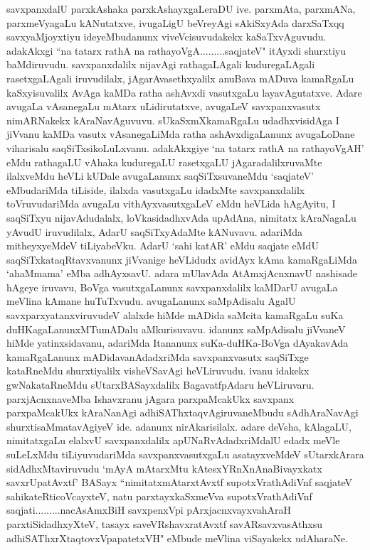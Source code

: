 \begin{artha}
savxpanxdalU parxkAshaka parxkAshayxgaLeraDU ive. parxmAta, parxmANa, parxmeVyagaLu kANutatxve, ivugaLigU beVreyAgi sAkiSxyAda darxSaTxqq savxyaMjoyxtiyu ideyeMbudanunx viveVcisuvudakekx kaSaTxvAguvudu. adakAkxgi ``na tatarx rathA na rathayoVgA.........saqjateV" itAyxdi shurxtiyu baMdiruvudu. savxpanxdalilx nijavAgi rathagaLAgali kuduregaLAgali rasetxgaLAgali iruvudilalx, jAgarAvasethxyalilx anuBava mADuva kamaRgaLu kaSxyisuvalilx AvAga kaMDa ratha ashAvxdi vasutxgaLu layavAgutatxve. Adare avugaLa vAsanegaLu mAtarx uLidirutatxve, avugaLeV savxpanxvasutx nimARNakekx kAraNavAguvuvu. sUkaSxmXkamaRgaLu udadhxvisidAga I jiVvanu kaMDa vasutx vAsanegaLiMda ratha ashAvxdigaLanunx avugaLoDane viharisalu saqSiTxsikoLuLxvanu. adakAkxgiye `na tatarx rathA na rathayoVgAH' eMdu rathagaLU vAhaka kuduregaLU rasetxgaLU jAgaradalilxruvaMte ilalxveMdu heVLi kUDale avugaLanunx saqSiTxsuvaneMdu `saqjateV' eMbudariMda tiLiside, ilalxda vasutxgaLu idadxMte savxpanxdalilx toVruvudariMda avugaLu vithAyxvasutxgaLeV eMdu heVLida hAgAyitu, I saqSiTxyu nijavAdudalalx, loVkasidadhxvAda upAdAna, nimitatx kAraNagaLu yAvudU iruvudilalx, AdarU saqSiTxyAdaMte kANuvavu. adariMda mitheyxyeMdeV tiLiyabeVku. AdarU `sahi katAR' eMdu saqjate eMdU saqSiTxkataqRtavxvanunx jiVvanige heVLidudx avidAyx kAma kamaRgaLiMda `ahaMmama' eMba adhAyxsavU. adara mUlavAda AtAmxjAcnxnavU nashisade hAgeye iruvavu, BoVga vasutxgaLanunx savxpanxdalilx kaMDarU avugaLa meVlina kAmane huTuTxvudu. avugaLanunx saMpAdisalu AgalU savxparxyatanxviruvudeV alalxde hiMde mADida saMcita kamaRgaLu suKa duHKagaLanunxMTumADalu aMkurisuvavu. idanunx saMpAdisalu jiVvaneV hiMde yatinxsidavanu, adariMda Itananunx suKa-duHKa-BoVga dAyakavAda kamaRgaLanunx mADidavanAdadxriMda savxpanxvasutx saqSiTxge kataRneMdu shurxtiyalilx visheVSavAgi heVLiruvudu. ivanu idakekx gwNakataRneMdu sUtarxBASayxdalilx BagavatfpAdaru heVLiruvaru. parxjAcnxnaveMba Ishavxranu jAgara parxpaMcakUkx savxpanx parxpaMcakUkx kAraNanAgi adhiSAThxtaqvAgiruvaneMbudu sAdhAraNavAgi shurxtisaMmatavAgiyeV ide. adanunx nirAkarisilalx. adare deVsha, kAlagaLU, nimitatxgaLu elalxvU savxpanxdalilx apUNaRvAdadxriMdalU edadx meVle suLeLxMdu tiLiyuvudariMda savxpanxvasutxgaLu asatayxveMdeV sUtarxkArara sidAdhxMtaviruvudu `mAyA mAtarxMtu kAtesxYRnXnAnaBivayxkatx savxrUpatAvxtf' BASayx ``nimitatxmAtarxtAvxtf supotxVrathAdiVnf saqjateV sahikateRticoVcayxteV, natu parxtayxkaSxmeVva supotxVrathAdiVnf saqjati.........nacAsAmxBiH savxpenxV\s pi pArxjacnxvayxvahAraH parxtiSidadhxyXteV, tasayx saveVRshavxratAvxtf savARsavxvasAthxsu adhiSAThxrXtaqtovxVpapatetxVH"  eMbude meVlina viSayakekx udAharaNe.
\end{artha}%

